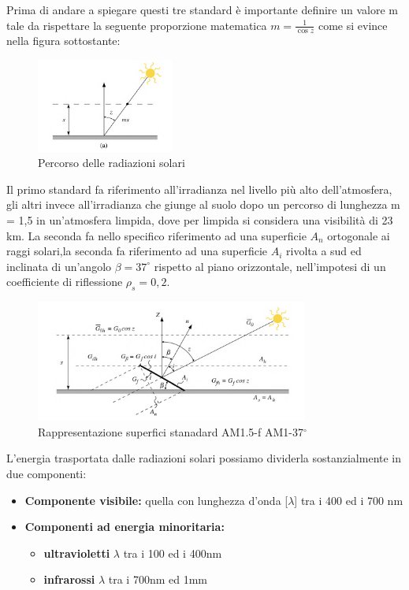 Prima di andare a spiegare questi tre standard è importante definire un valore m tale da rispettare la seguente proporzione matematica $m=\frac{1}{\cos z}$ come si evince nella figura sottostante:
\begin{figure}[H]
    \centering
    \includegraphics[width=0.4\textwidth]{res/cap2/rappresentazione m}
    \caption{Percorso delle radiazioni solari}
\end{figure}
Il primo standard fa riferimento all'irradianza nel livello più alto dell'atmosfera,
gli altri invece all'irradianza che giunge al suolo dopo un percorso di lunghezza m = 1,5 in un'atmosfera limpida, dove per limpida si considera una visibilità di 23 km.
La seconda fa nello specifico riferimento ad una superficie $A_n$ ortogonale ai raggi solari,la seconda fa riferimento ad una superficie $A_i$ rivolta a sud ed inclinata di un'angolo $\beta = 37^\circ$ rispetto al piano orizzontale, nell'impotesi di un coefficiente di riflessione $\rho_s = 0,2$.
\begin{figure}[H]
    \centering
    \includegraphics[width=0.8\textwidth]{res/cap2/standard}
    \caption{Rappresentazione superfici stanadard AM1.5-f AM1-37$^\circ$}
\end{figure}
L'energia trasportata dalle radiazioni solari possiamo dividerla sostanzialmente in due componenti:
\begin{itemize}
    \item \textbf{Componente visibile:} quella con lunghezza d'onda [\textbf{$\lambda$}] tra i 400 ed i 700 nm
    \item \textbf{Componenti ad energia minoritaria:} 
        \begin{itemize}
            \item \textbf{ultravioletti} \textbf{$\lambda$} tra i 100 ed i 400nm
            \item \textbf{infrarossi} \textbf{$\lambda$} tra i 700nm ed 1mm
        \end{itemize}
\end{itemize}
